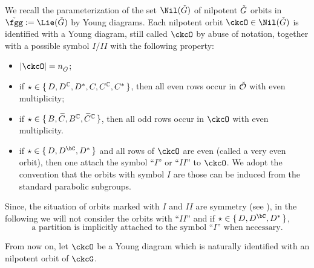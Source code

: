 \documentclass[counting_main.tex]{subfiles}
\begin{document}
 We recall the parameterization of the set $\Nil(\ckG)$ of nilpotent $\check{G}$
 orbits in $\ckfgg:=\Lie(\ckG)$ by Young diagrams. Each nilpotent orbit
 $\ckcO\in \Nil(\ckG)$ is identified with a Young diagram, still called $\ckcO$
 by abuse of notation, together with a possible symbol $I/II$ with the following
 property:
 \begin{itemize}
   \item $\abs{\ckcO}=n_{\check G}$;
   \item if $\star\in\set{D, D^{\mathbb{C}}, D^*,C, C^{\mathbb{C}}, C^* } $, then all even rows
         occur in $\check {{\mathcal {O}}}$ with even multiplicity;
   \item if $\star\in \set{B, \widetilde C, B^{\mathbb{C}}, \widetilde C^{\mathbb{C}}}$, then all
         odd rows occur in $\ckcO$ with even multiplicity.
   \item if $\star\in \set{D,D^{\bC},D^{*}}$ and all rows of $\ckcO$ are even
         (called a very even orbit), then one attach the symbol ``$I$'' or
         ``$II$'' to $\ckcO$. We adopt the convention that the orbits with
         symbol $I$ are those can be induced from the standard parabolic
         subgroups. 
 \end{itemize}
 Since, the situation of orbits marked with $I$ and $II$ are symmetry (see
 ), in the following we will not consider the orbits with ``$II$''
 and if $\star\in \set{D,D^{\bC},D^{*}}$,
 \[
   \text{ a partition is implicitly attached to the symbol ``$I$'' when
     necessary. }
 \]


 \smallskip

 From now on, let $\ckcO$ be a Young diagram which is naturally identified with
 an nilpotent orbit of $\ckcG$.
\end{document}
